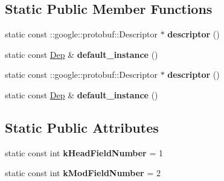 \subsection*{Static Public Member Functions}
\begin{DoxyCompactItemize}
\item 
\hypertarget{classDep_af6a909e7ccf42b8c3b81cd01755a6f89}{
static const ::google::protobuf::Descriptor $\ast$ {\bfseries descriptor} ()}
\label{classDep_af6a909e7ccf42b8c3b81cd01755a6f89}

\item 
\hypertarget{classDep_adb231b00d2868737d7eed4a97c085c7b}{
static const \hyperlink{classDep}{Dep} \& {\bfseries default\_\-instance} ()}
\label{classDep_adb231b00d2868737d7eed4a97c085c7b}

\item 
\hypertarget{classDep_a29bfc132af3268c281ed5b2bfb7e09b5}{
static const ::google::protobuf::Descriptor $\ast$ {\bfseries descriptor} ()}
\label{classDep_a29bfc132af3268c281ed5b2bfb7e09b5}

\item 
\hypertarget{classDep_a81ccd4891740b599546e7e52c04ca516}{
static const \hyperlink{classDep}{Dep} \& {\bfseries default\_\-instance} ()}
\label{classDep_a81ccd4891740b599546e7e52c04ca516}

\end{DoxyCompactItemize}
\subsection*{Static Public Attributes}
\begin{DoxyCompactItemize}
\item 
\hypertarget{classDep_a30b9f1997de8bc996e1b0e1d5220dd99}{
static const int {\bfseries kHeadFieldNumber} = 1}
\label{classDep_a30b9f1997de8bc996e1b0e1d5220dd99}

\item 
\hypertarget{classDep_acb384371c72fcc36536bdb88a88cd05a}{
static const int {\bfseries kModFieldNumber} = 2}
\label{classDep_acb384371c72fcc36536bdb88a88cd05a}

\end{DoxyCompactItemize}
